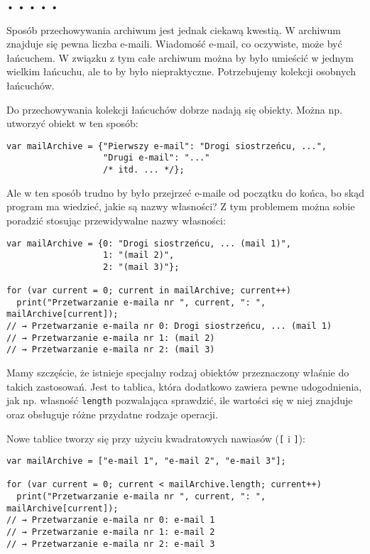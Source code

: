   
  
\begin{center}
• • • • •
\end{center}
  
    
Sposób przechowywania archiwum jest jednak ciekawą kwestią. W archiwum znajduje się pewna liczba e-maili. Wiadomość e-mail, co oczywiste, może być łańcuchem. W związku z tym całe archiwum można by było umieścić w jednym wielkim łańcuchu, ale to by było niepraktyczne. Potrzebujemy kolekcji osobnych łańcuchów.

    
Do przechowywania kolekcji łańcuchów dobrze nadają się obiekty. Można np. utworzyć obiekt w ten sposób:

    
\begin{verbatim} 
var mailArchive = {"Pierwszy e-mail": "Drogi siostrzeńcu, ...",
                   "Drugi e-mail": "..."
                   /* itd. ... */};
 \end{verbatim}
    
Ale w ten sposób trudno by było przejrzeć e-maile od początku do końca, bo skąd program ma wiedzieć, jakie są nazwy własności? Z tym problemem można sobie poradzić stosując przewidywalne nazwy własności:

    
\begin{verbatim} 
var mailArchive = {0: "Drogi siostrzeńcu, ... (mail 1)",
                   1: "(mail 2)",
                   2: "(mail 3)"};

for (var current = 0; current in mailArchive; current++)
  print("Przetwarzanie e-maila nr ", current, ": ", mailArchive[current]);
// → Przetwarzanie e-maila nr 0: Drogi siostrzeńcu, ... (mail 1)
// → Przetwarzanie e-maila nr 1: (mail 2)
// → Przetwarzanie e-maila nr 2: (mail 3)
\end{verbatim}
    
Mamy szczęście, że istnieje specjalny rodzaj obiektów przeznaczony właśnie do takich zastosowań. Jest to tablica, która dodatkowo zawiera pewne udogodnienia, jak np. własność \texttt{length} pozwalająca sprawdzić, ile wartości się w niej znajduje oraz obsługuje różne przydatne rodzaje operacji.

    
\index{[]}Nowe tablice tworzy się przy użyciu kwadratowych nawiasów (\texttt{[} i \texttt{]}):

    
\begin{verbatim} 
var mailArchive = ["e-mail 1", "e-mail 2", "e-mail 3"];

for (var current = 0; current < mailArchive.length; current++)
  print("Przetwarzanie e-maila nr ", current, ": ", mailArchive[current]);
// → Przetwarzanie e-maila nr 0: e-mail 1
// → Przetwarzanie e-maila nr 1: e-mail 2
// → Przetwarzanie e-maila nr 2: e-mail 3
\end{verbatim}
    
